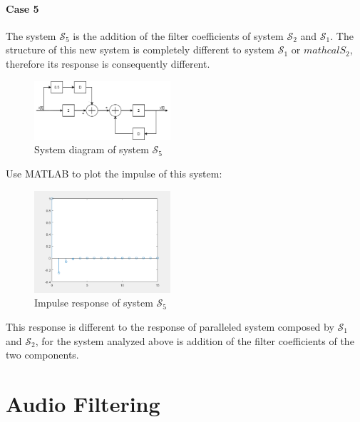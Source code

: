 \documentclass[conference]{IEEEtran}
\begin{document}
\paragraph{Case 5}
The system \(\mathcal{S}_{5}\) is the addition of the filter coefficients of system \(\mathcal{S}_{2}\) and \(\mathcal{S}_{1}\). The structure of this new system is completely different to system \(\mathcal{S}_{1}\) or \(mathcal{S}_{2}\),
therefore its response is consequently different.

\begin{figure}[htpb]
	\centering
	\includegraphics[width=0.45\textwidth]{24-5.png}
	\caption{System diagram of system \(\mathcal{S}_{5}\)}
	\label{fig:21}
\end{figure}

Use MATLAB to plot the impulse of this system:

\begin{figure}[htpb]
	\begin{small}
		\begin{center}
			\includegraphics[width=0.45\textwidth]{../matlab/q24_5.png}
		\end{center}
		\caption{Impulse response of system \(\mathcal{S}_{5}\)}
		\label{fig:22}
	\end{small}
\end{figure}
This response is different to the response of paralleled system composed by \(\mathcal{S}_{1}\) and \(\mathcal{S}_{2}\), for the system analyzed above is addition of the filter coefficients of the two components.

\section{Audio Filtering}
\end{document}
